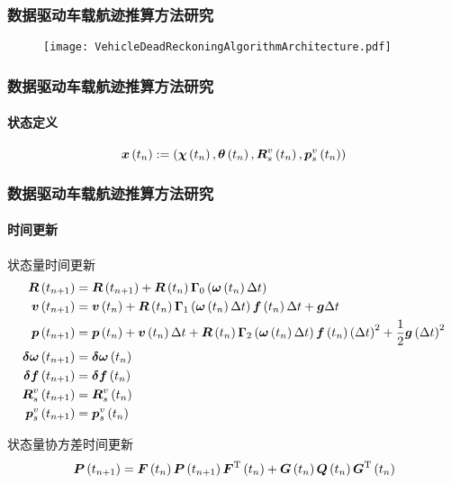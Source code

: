 \begin{frame}
	\frametitle{数据驱动车载航迹推算方法研究} 
   	\begin{figure}
   	\centering
   	    \texttt{[image: VehicleDeadReckoningAlgorithmArchitecture.pdf]}
   	\end{figure} 
\end{frame}

\begin{frame}
	\frametitle{数据驱动车载航迹推算方法研究}	
	\framesubtitle{状态定义}	
	\begin{equation*}
	   	\vb*{x}\left(t_n\right) := \left( \vb*{\chi}\left(t_n\right), \vb*{\theta}\left(t_n\right), \vb*{R}_s^v\left(t_n\right), \vb*{p}_s^v\left(t_n\right)\right) 
	   	\label{eq:InvariantExtendedKalmanFilterPedestrianState}
	\end{equation*} 
\end{frame}

\begin{frame}
	\frametitle{数据驱动车载航迹推算方法研究}	
	\framesubtitle{时间更新}
	\vspace{-0.2cm}
	{\small
		状态量时间更新
		\begin{align*}
			\vb*{R}\left(t_{n+1}\right) &= \vb*{R}\left(t_{n+1}\right) + \vb*{R}\left(t_{n}\right) \vb*{\Gamma}_{0}\left( \vb*{\omega}\left(t_{n}\right) \Delta t \right) \\
			\vb*{v}\left(t_{n+1}\right) &= \vb*{v}\left(t_{n}\right) 
			+ \vb*{R}\left(t_{n}\right) \vb*{\Gamma}_{1}\left( \vb*{\omega}\left(t_{n}\right) \Delta t \right) \vb*{f}\left(t_{n}\right) \Delta t 
			+ \vb*{g}\Delta t \\
			\vb*{p}\left(t_{n+1}\right) &= \vb*{p}\left(t_{n}\right) 
			+ \vb*{v}\left(t_{n}\right) \Delta t
			+ \vb*{R}\left(t_{n}\right) \vb*{\Gamma}_{2}\left( \vb*{\omega}\left(t_{n}\right) \Delta t \right) \vb*{f}\left(t_{n}\right) \left(\Delta t\right)^2 
			+ \frac{1}{2}\vb*{g}\left(\Delta t\right)^2 \\
			\vb*{\delta \omega}\left(t_{n+1}\right) &= \vb*{\delta \omega}\left(t_{n}\right) \\
			\vb*{\delta f}\left(t_{n+1}\right) &= \vb*{\delta f}\left(t_{n}\right) \\
			\vb*{R}_s^v\left(t_{n+1}\right) &= \vb*{R}_s^v\left(t_{n}\right) \\
			\vb*{p}_s^v\left(t_{n+1}\right) &= \vb*{p}_s^v\left(t_{n}\right) 
		\end{align*}
		
		状态量协方差时间更新
		\begin{equation*}
			\vb*{P}\left(t_{n+1}\right) = \vb*{F}\left(t_{n}\right) \vb*{P}\left(t_{n+1}\right) \vb*{F}^{\mathrm{T}}\left(t_{n}\right)
			+ \vb*{G}\left(t_{n}\right) \vb*{Q}\left(t_{n}\right) \vb*{G}^{\mathrm{T}}\left(t_{n}\right)
		\end{equation*}
	}
 
\end{frame}

